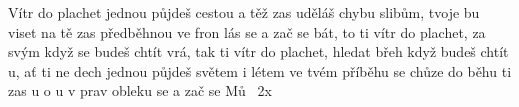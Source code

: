 \begin{TEXT}{Vítr do plachet}
\SLOKA {} jednou půjdeš cestou  a těž  \NL
{} zas uděláš chybu  slibům,   \NL
{} tvoje  bu viset na  \NL
{} tě zas předběhnou ve fron lás \NL
{} se  a zač se bát,   to 
\REFREN {} ti vítr do plachet,   za svým  \NL
{} když se budeš chtít vrá, tak  \NL
{} ti vítr do plachet,   hledat břeh \NL
{} když budeš chtít u, ať ti  ne dech
\SLOKA {} jednou půjdeš světem  i létem \NL
{} ve tvém příběhu  se chůze do běhu \NL
{} ti zas u o u  \NL
{}  v prav obleku \NL
{} se  a zač se  \NL
Mů
\REFRENHRAJ ~2x
\end{TEXT}
